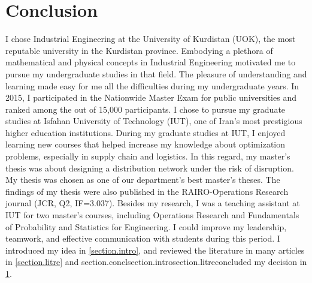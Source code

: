 \documentclass[11pt,a4paper,twocolumn]{article}
\begin{document}
\section{Conclusion}\label{section.concl}
I chose Industrial Engineering at the University of Kurdistan (UOK), the most reputable university in the Kurdistan province. Embodying a plethora of mathematical and physical concepts in Industrial Engineering motivated me to pursue my undergraduate studies in that field. The pleasure of understanding and learning made easy for me all the difficulties during my undergraduate years. In 2015, I participated in the Nationwide Master Exam for public universities and ranked among the out of 15,000 participants. I chose to pursue my graduate studies at Isfahan University of Technology (IUT), one of Iran's most prestigious higher education institutions. During my graduate studies at IUT, I enjoyed learning new courses that helped increase my knowledge about optimization problems, especially in supply chain and logistics. In this regard, my master's thesis was about designing a distribution network under the risk of disruption. My thesis was chosen as one of our department's best master's theses. The findings of my thesis were also published in the RAIRO-Operations Research journal (JCR, Q2, IF=3.037). Besides my research, I was a teaching assistant at IUT for two master's courses, including Operations Research and Fundamentals of Probability and Statistics for Engineering. I could improve my leadership, teamwork, and effective communication with students during this period.
I introduced my idea in \ref{section.intro}, and reviewed the literature in many articles in \ref{section.litre} and section.conclsection.introsection.litreconcluded my decision in \ref{section.concl}.
\end{document}

